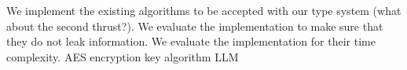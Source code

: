 We implement the existing algorithms to be accepted with our type system (what about the second thrust?). We evaluate the implementation to make sure that they do not leak information. We evaluate the implementation for their time complexity.
AES encryption key algorithm
LLM 

